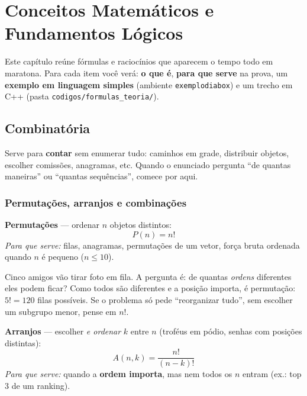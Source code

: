\chapter{Conceitos Matemáticos e Fundamentos Lógicos}

Este capítulo reúne fórmulas e raciocínios que aparecem o tempo todo em maratona.
Para cada item você verá: \textbf{o que é}, \textbf{para que serve} na prova, um \textbf{exemplo em linguagem simples} (ambiente \texttt{exemplodiabox}) e um trecho em C++ (pasta \texttt{codigos/formulas\_teoria/}).

\section{Combinatória}

Serve para \textbf{contar} sem enumerar tudo: caminhos em grade, distribuir objetos, escolher comissões, anagramas, etc.
Quando o enunciado pergunta ``de quantas maneiras'' ou ``quantas sequências'', comece por aqui.

\subsection{Permutações, arranjos e combinações}

\textbf{Permutações} --- ordenar $n$ objetos distintos:
\begin{equation}
  P(n) = n!
\end{equation}  
\emph{Para que serve:} filas, anagramas, permutações de um vetor, força bruta ordenada quando $n$ é pequeno ($n \le 10$).

\begin{exemplodiabox}
Cinco amigos vão tirar foto em fila. A pergunta é: de quantas \emph{ordens} diferentes eles podem ficar? Como todos são diferentes e a posição importa, é permutação: $5! = 120$ filas possíveis. Se o problema só pede ``reorganizar tudo'', sem escolher um subgrupo menor, pense em $n!$.
\end{exemplodiabox}


\textbf{Arranjos} --- escolher \emph{e ordenar} $k$ entre $n$ (troféus em pódio, senhas com posições distintas):
\begin{equation}
  A(n,k) = \frac{n!}{(n-k)!}
\end{equation}
\emph{Para que serve:} quando a \textbf{ordem importa}, mas nem todos os $n$ entram (ex.: top 3 de um ranking).

